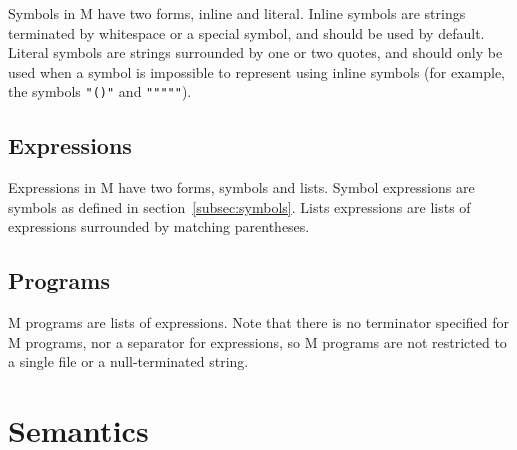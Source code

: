 \documentclass{article}
\newcommand{\comm}[1]{}
\begin{document}
\begin{multicols}{\comm{2}}
        \begin{minipage}{\columnwidth}
            Symbols in M have two forms, inline and literal.
            Inline symbols are strings terminated by whitespace or a special symbol, and should be used by default.
            Literal symbols are strings surrounded by one or two quotes, and should only be used when a symbol is impossible to represent using inline symbols (for example, the symbols \texttt{"()"} and \texttt{"""""}).
        \end{minipage}

        \subsection{Expressions}\label{subsec:expressions}

        \begin{minipage}{\columnwidth}
            Expressions in M have two forms, symbols and lists.
            Symbol expressions are symbols as defined in section~\ref{subsec:symbols}.
            Lists expressions are lists of expressions surrounded by matching parentheses.
        \end{minipage}

        \subsection{Programs}\label{subsec:programs}

        \begin{minipage}{\columnwidth}
            M programs are lists of expressions.
            Note that there is no terminator specified for M programs, nor a separator for expressions, so M programs are not restricted to a single file or a null-terminated string.
        \end{minipage}
    \end{multicols}
    \newpage

    \section{Semantics}\label{sec:semantics}
\end{document}
